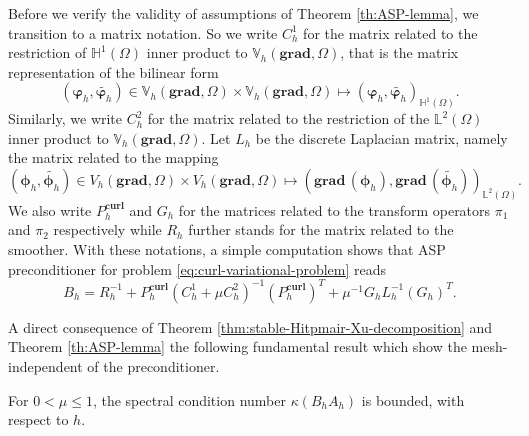 Before we verify the validity of assumptions of Theorem \ref{th:ASP-lemma}, we transition to a matrix notation. So we write $C_h^1$ for the matrix related to the restriction of $\mathbb{H}^1(\Omega)$ inner product to $\mathbb{V}_h(\textbf{grad},\Omega)$, that is the matrix representation of the bilinear form 
\begin{equation*}
(\bm{\varphi}_h,\widetilde{\bm{\varphi}_h}) \in \mathbb{V}_h(\textbf{grad},\Omega) \times \mathbb{V}_h(\textbf{grad},\Omega)  \mapsto (\bm{\varphi}_h,\widetilde{\bm{\varphi}_h})_{\mathbb{H}^1(\Omega)}.
\end{equation*}
Similarly, we write $C_h^2$ for the matrix related to the restriction of the $\mathbb{L}^2(\Omega)$ inner product to $\mathbb{V}_h(\textbf{grad},\Omega)$. Let $L_h$ be the discrete Laplacian matrix, namely the matrix related to the mapping  
\begin{equation*}
(\bm{\phi}_h,\widetilde{\bm{\phi}_h}) \in V_h(\textbf{grad},\Omega) \times V_h(\textbf{grad},\Omega)  \longmapsto \left(\textbf{grad}\,(\bm{\phi}_h),\textbf{grad}\,(\widetilde{\bm{\phi}_h})\right)_{\mathbb{L}^2(\Omega)}.
\end{equation*}
We also write $P_h^{\textbf{curl}}$ and $G_h$  for the matrices related to the transform operators $\pi_1$ and $\pi_2$ respectively while $R_h$ further stands for the matrix related to the smoother. With these notations, a simple computation shows that ASP preconditioner  for problem \eqref{eq:curl-variational-problem} reads 
\begin{equation*}
B_h=R_h^{-1} + P_h^{\textbf{curl}}  \left(C_h^1+\mu C_h^2 \right)^{-1} \left( P_h^{\textbf{curl}}\right)^T + \mu^{-1} G_h L_h^{-1} \left(G_h\right)^T. 
\end{equation*}

A direct consequence of Theorem \ref{thm:stable-Hitpmair-Xu-decomposition} and Theorem \ref{th:ASP-lemma} the following fundamental result which show the mesh-independent of the preconditioner.
\begin{theorem}
For $0 < \mu \leq 1$, the spectral condition number $\kappa \left( B_h A_h\right)$ is bounded, with respect to $h$.
\end{theorem}





















